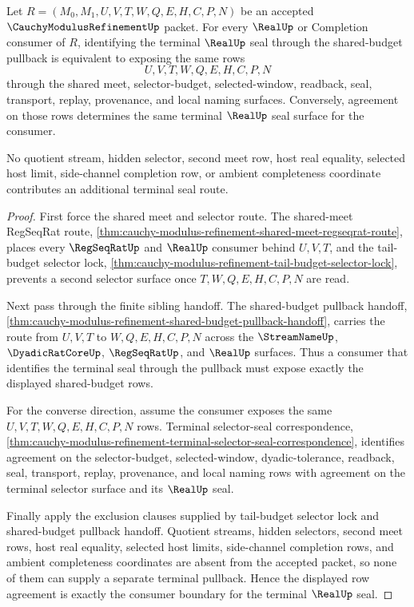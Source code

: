 \begin{theorem}
\label{thm:cauchy-modulus-refinement-terminal-real-seal-pullback-exhaustion}
Let $R=(M_0,M_1,U,V,T,W,Q,E,H,C,P,N)$ be an accepted $\CauchyModulusRefinementUp$ packet. For every $\RealUp$ or Completion consumer of $R$, identifying the terminal $\RealUp$ seal through the shared-budget pullback is equivalent to exposing the same rows
$$
U,V,T,W,Q,E,H,C,P,N
$$
through the shared meet, selector-budget, selected-window, readback, seal, transport, replay, provenance, and local naming surfaces. Conversely, agreement on those rows determines the same terminal $\RealUp$ seal surface for the consumer.

No quotient stream, hidden selector, second meet row, host real equality, selected host limit, side-channel completion row, or ambient completeness coordinate contributes an additional terminal seal route.
\end{theorem}
\begin{proof}
First force the shared meet and selector route. The shared-meet RegSeqRat route, \autoref{thm:cauchy-modulus-refinement-shared-meet-regseqrat-route}, places every $\RegSeqRatUp$ and $\RealUp$ consumer behind $U,V,T$, and the tail-budget selector lock, \autoref{thm:cauchy-modulus-refinement-tail-budget-selector-lock}, prevents a second selector surface once $T,W,Q,E,H,C,P,N$ are read.

Next pass through the finite sibling handoff. The shared-budget pullback handoff, \autoref{thm:cauchy-modulus-refinement-shared-budget-pullback-handoff}, carries the route from $U,V,T$ to $W,Q,E,H,C,P,N$ across the $\StreamNameUp$, $\DyadicRatCoreUp$, $\RegSeqRatUp$, and $\RealUp$ surfaces. Thus a consumer that identifies the terminal seal through the pullback must expose exactly the displayed shared-budget rows.

For the converse direction, assume the consumer exposes the same $U,V,T,W,Q,E,H,C,P,N$ rows. Terminal selector-seal correspondence, \autoref{thm:cauchy-modulus-refinement-terminal-selector-seal-correspondence}, identifies agreement on the selector-budget, selected-window, dyadic-tolerance, readback, seal, transport, replay, provenance, and local naming rows with agreement on the terminal selector surface and its $\RealUp$ seal.

Finally apply the exclusion clauses supplied by tail-budget selector lock and shared-budget pullback handoff. Quotient streams, hidden selectors, second meet rows, host real equality, selected host limits, side-channel completion rows, and ambient completeness coordinates are absent from the accepted packet, so none of them can supply a separate terminal pullback. Hence the displayed row agreement is exactly the consumer boundary for the terminal $\RealUp$ seal.
\end{proof}

